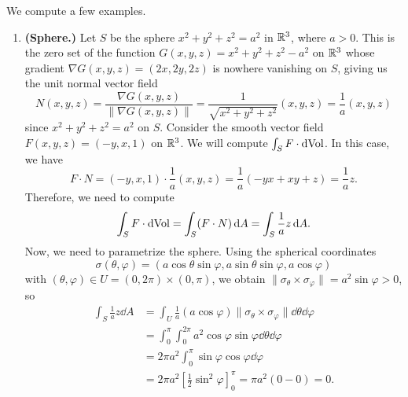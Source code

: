 We compute a few examples. 
\begin{enumerate}[(1)]
    \item {\bf (Sphere.)} Let $S$ be the sphere $x^2 + y^2 + z^2 = a^2$ in $\mathbb{R}^3$, where $a > 0$. 
    This is the zero set of the function $G(x, y, z) = x^2 + y^2 + z^2 - a^2$ on 
    $\mathbb{R}^3$ whose gradient $\nabla G(x, y, z) = (2x, 2y, 2z)$ is nowhere vanishing 
    on $S$, giving us the unit normal vector field 
    \[ N(x, y, z) = \frac{\nabla G(x, y, z)}{\|\nabla G(x, y, z)\|} 
    = \frac{1}{\sqrt{x^2+y^2+z^2}}(x, y, z) = \frac1a(x, y, z) \] 
    since $x^2 + y^2 + z^2 = a^2$ on $S$. Consider the smooth vector field 
    $F(x, y, z) = (-y, x, 1)$ on $\mathbb{R}^3$. We will compute $\int_S F\cdot\operatorname{dVol}$. 
    In this case, we have 
    \[ F \cdot N = (-y, x, 1) \cdot \frac1a(x, y, z) = \frac1a(-yx + xy + z) 
    = \frac1az. \] 
    Therefore, we need to compute 
    \[ \int_S F \cdot \operatorname{dVol} = \int_S (F \cdot N)\,\mathrm{d} A = \int_S \frac1az \,\mathrm{d} A. \] 
    Now, we need to parametrize the sphere. Using the spherical coordinates 
    \[ \sigma(\theta, \varphi) = (a\cos\theta\sin\varphi, a\sin\theta\sin\varphi, a\cos\varphi) \] 
    with $(\theta, \varphi) \in U = (0, 2\pi) \times (0, \pi)$, we obtain 
    $\|\sigma_\theta \times \sigma_\varphi\| = a^2 \sin\varphi > 0$, so 
    \begin{align*}
        \int_S \frac1az\dd A 
        &= \int_U \frac1a(a\cos\varphi)\|\sigma_\theta \times \sigma_\varphi\|\dd\theta\dd\varphi \\ 
        &= \int_0^\pi \int_0^{2\pi} a^2 \cos\varphi \sin\varphi \dd\theta\dd\varphi \\ 
        &= 2\pi a^2 \int_0^\pi \sin\varphi \cos\varphi \dd\varphi \\ 
        &= 2\pi a^2 \left[ \frac12 \sin^2\varphi \right]_0^\pi = \pi a^2(0 - 0) = 0. 
    \end{align*}


\end{enumerate}
